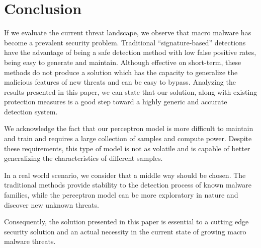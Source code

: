 \section{Conclusion}
\par
If we evaluate the current threat landscape, we observe that macro malware has become a prevalent security problem. 
Traditional “signature-based” detections have the advantage of being a safe detection method with low false positive rates, being easy to generate and maintain. Although effective on short-term, these methods do not produce a solution which has the capacity to generalize the malicious features of new threats and can be easy to bypass. Analyzing the results presented in this paper, we can state that our solution, along with existing protection measures is a good step toward a highly generic and accurate detection system. 
\par
We acknowledge the fact that our perceptron model is more difficult to maintain and train and requires a large collection of samples and compute power. Despite these requirements, this type of model is not as volatile and is capable of better generalizing the characteristics of different samples.
\par
In a real world scenario, we consider that a middle way should be chosen. The traditional methods provide stability to the detection process of known malware families, while the perceptron model can be more exploratory in nature and discover new unknown threats.
\par
Consequently, the solution presented in this paper is essential to a cutting edge security solution and an actual necessity in the current state of growing macro malware threats.
